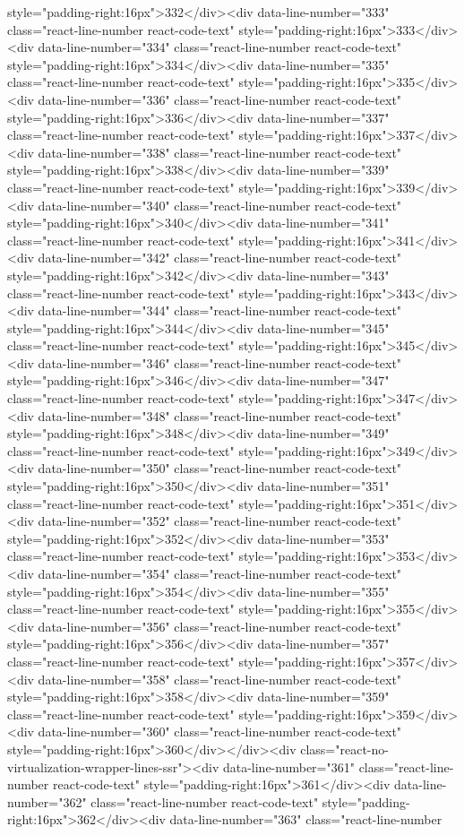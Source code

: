 {{{{{style="padding-right:16px">332</div><div data-line-number="333" class="react-line-number react-code-text" style="padding-right:16px">333</div><div data-line-number="334" class="react-line-number react-code-text" style="padding-right:16px">334</div><div data-line-number="335" class="react-line-number react-code-text" style="padding-right:16px">335</div><div data-line-number="336" class="react-line-number react-code-text" style="padding-right:16px">336</div><div data-line-number="337" class="react-line-number react-code-text" style="padding-right:16px">337</div><div data-line-number="338" class="react-line-number react-code-text" style="padding-right:16px">338</div><div data-line-number="339" class="react-line-number react-code-text" style="padding-right:16px">339</div><div data-line-number="340" class="react-line-number react-code-text" style="padding-right:16px">340</div><div data-line-number="341" class="react-line-number react-code-text" style="padding-right:16px">341</div><div data-line-number="342" class="react-line-number react-code-text" style="padding-right:16px">342</div><div data-line-number="343" class="react-line-number react-code-text" style="padding-right:16px">343</div><div data-line-number="344" class="react-line-number react-code-text" style="padding-right:16px">344</div><div data-line-number="345" class="react-line-number react-code-text" style="padding-right:16px">345</div><div data-line-number="346" class="react-line-number react-code-text" style="padding-right:16px">346</div><div data-line-number="347" class="react-line-number react-code-text" style="padding-right:16px">347</div><div data-line-number="348" class="react-line-number react-code-text" style="padding-right:16px">348</div><div data-line-number="349" class="react-line-number react-code-text" style="padding-right:16px">349</div><div data-line-number="350" class="react-line-number react-code-text" style="padding-right:16px">350</div><div data-line-number="351" class="react-line-number react-code-text" style="padding-right:16px">351</div><div data-line-number="352" class="react-line-number react-code-text" style="padding-right:16px">352</div><div data-line-number="353" class="react-line-number react-code-text" style="padding-right:16px">353</div><div data-line-number="354" class="react-line-number react-code-text" style="padding-right:16px">354</div><div data-line-number="355" class="react-line-number react-code-text" style="padding-right:16px">355</div><div data-line-number="356" class="react-line-number react-code-text" style="padding-right:16px">356</div><div data-line-number="357" class="react-line-number react-code-text" style="padding-right:16px">357</div><div data-line-number="358" class="react-line-number react-code-text" style="padding-right:16px">358</div><div data-line-number="359" class="react-line-number react-code-text" style="padding-right:16px">359</div><div data-line-number="360" class="react-line-number react-code-text" style="padding-right:16px">360</div></div><div class="react-no-virtualization-wrapper-lines-ssr"><div data-line-number="361" class="react-line-number react-code-text" style="padding-right:16px">361</div><div data-line-number="362" class="react-line-number react-code-text" style="padding-right:16px">362</div><div data-line-number="363" class="react-line-number }}}}}
